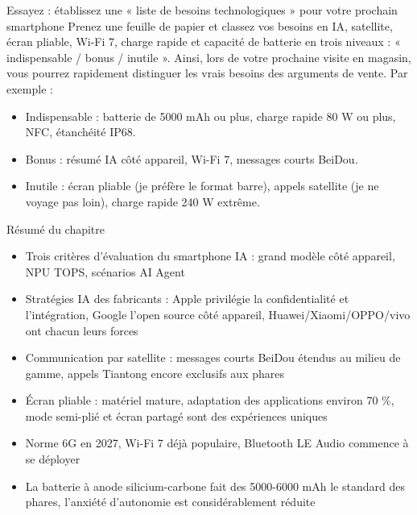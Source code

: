 \begin{tcbpractice}{Essayez : établissez une « liste de besoins technologiques » pour votre prochain smartphone}
Prenez une feuille de papier et classez vos besoins en IA, satellite, écran pliable, Wi-Fi 7, charge rapide et capacité de batterie en trois niveaux : « indispensable / bonus / inutile ». Ainsi, lors de votre prochaine visite en magasin, vous pourrez rapidement distinguer les vrais besoins des arguments de vente. Par exemple :

\begin{itemize}
  \item Indispensable : batterie de 5000 mAh ou plus, charge rapide 80 W ou plus, NFC, étanchéité IP68.
  \item Bonus : résumé IA côté appareil, Wi-Fi 7, messages courts BeiDou.
  \item Inutile : écran pliable (je préfère le format barre), appels satellite (je ne voyage pas loin), charge rapide 240 W extrême.
\end{itemize}

\end{tcbpractice}

\begin{tcbsummary}{Résumé du chapitre}
\begin{itemize}
  \item Trois critères d'évaluation du smartphone IA : grand modèle côté appareil, NPU TOPS, scénarios AI Agent
  \item Stratégies IA des fabricants : Apple privilégie la confidentialité et l'intégration, Google l'open source côté appareil, Huawei/Xiaomi/OPPO/vivo ont chacun leurs forces
  \item Communication par satellite : messages courts BeiDou étendus au milieu de gamme, appels Tiantong encore exclusifs aux phares
  \item Écran pliable : matériel mature, adaptation des applications environ 70 \%, mode semi-plié et écran partagé sont des expériences uniques
  \item Norme 6G en 2027, Wi-Fi 7 déjà populaire, Bluetooth LE Audio commence à se déployer
  \item La batterie à anode silicium-carbone fait des 5000-6000 mAh le standard des phares, l'anxiété d'autonomie est considérablement réduite
\end{itemize}

\end{tcbsummary}
